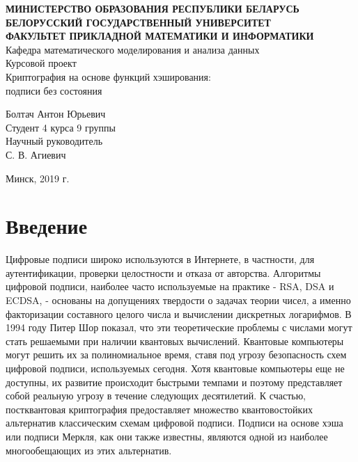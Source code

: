 \documentclass[a4paper, 14pt]{extarticle}
\begin{document}

\begin{center}
    \normalsize{\textbf{МИНИСТЕРСТВО ОБРАЗОВАНИЯ РЕСПУБЛИКИ БЕЛАРУСЬ}}\\
    \hfill \break
    \normalsize{\textbf{БЕЛОРУССКИЙ ГОСУДАРСТВЕННЫЙ УНИВЕРСИТЕТ}}\\
    \hfill \break
    \small{\textbf{ФАКУЛЬТЕТ ПРИКЛАДНОЙ МАТЕМАТИКИ И ИНФОРМАТИКИ}}\\
    \hfill \break
    \large{Кафедра математического моделирования и анализа данных}\\
    \vspace{40mm}
    \normalsize{Курсовой проект}\\
    \hfill \break
    \normalsize{Криптография на основе функций хэширования:\\ подписи без состояния}\\
    \hfill \break
\end{center}

\begin{flushright}
    \vspace{20mm}
    Болтач Антон Юрьевич\\
    Студент 4 курса 9 группы\\
    Научный руководитель\\
    С. В. Агиевич\\
\end{flushright}

\vfill
\begin{center}
    Минск, 2019 г.
\end{center}
\thispagestyle{empty} %
    

\newpage

\tableofcontents
\newpage

\section{Введение}
Цифровые подписи широко используются в Интернете, в частности, для аутентификации, проверки целостности и отказа от авторства. Алгоритмы цифровой подписи, наиболее часто используемые на практике - RSA, DSA и ECDSA, - основаны на допущениях твердости о задачах теории чисел, а именно факторизации составного целого числа и вычислении дискретных логарифмов. В 1994 году Питер Шор показал, что эти теоретические проблемы с числами могут стать решаемыми при наличии квантовых вычислений. Квантовые компьютеры могут решить их за полиномиальное время, ставя под угрозу безопасность схем цифровой подписи, используемых сегодня. Хотя квантовые компьютеры еще не доступны, их развитие происходит быстрыми темпами и поэтому представляет собой реальную угрозу в течение следующих десятилетий. К счастью, постквантовая криптография предоставляет множество квантовостойких альтернатив классическим схемам цифровой подписи. Подписи на основе хэша или подписи Меркля, как они также известны, являются одной из наиболее многообещающих из этих альтернатив.
\end{document}
